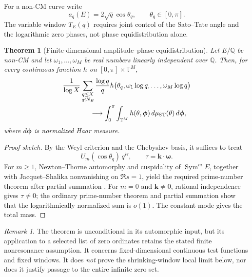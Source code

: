 \documentclass[11pt,reqno]{amsart}
\newtheorem{theorem}{Theorem}
\theoremstyle{remark}
\newtheorem{remark}{Remark}
\newcommand{\Q}{\mathbb{Q}}
\newcommand{\T}{\mathbb{T}}
\newcommand{\ST}{\mathrm{ST}}
\begin{document}
For a non-CM curve write
\begin{equation}
  a_q(E)=2\sqrt q\cos\theta_q,
  \qquad \theta_q\in[0,\pi].
\end{equation}
The variable window $T_E(q)$ requires joint control of the Sato--Tate angle and the logarithmic zero phases, not phase equidistribution alone.

\begin{theorem}[Finite-dimensional amplitude--phase equidistribution]
Let $E/\Q$ be non-CM and let $\omega_1,\ldots,\omega_M$ be real numbers linearly independent over $\Q$.  Then, for every continuous function $h$ on $[0,\pi]\times\T^M$,
\begin{align}
 &\frac{1}{\log X}
 \sum_{\substack{q\le X\\q\nmid N_E}}
 \frac{\log q}{q}
 h\bigl(\theta_q,\omega_1\log q,\ldots,\omega_M\log q\bigr)
 \notag\\
 &\hspace{4em}\longrightarrow
 \int_0^\pi\int_{\T^M}
 h(\theta,\boldsymbol\phi)\,
 d\mu_{\ST}(\theta)\,d\boldsymbol\phi,
 \label{eq:joint-equidistribution}
\end{align}
where $d\boldsymbol\phi$ is normalized Haar measure.
\end{theorem}

\begin{proof}[Proof sketch]
By the Weyl criterion and the Chebyshev basis, it suffices to treat
\begin{equation}
  U_m(\cos\theta_q)\,q^{i\tau},
  \qquad \tau=\boldsymbol k\cdot\boldsymbol\omega.
\end{equation}
For $m\ge1$, Newton--Thorne automorphy and cuspidality of $\operatorname{Sym}^mE$, together with Jacquet--Shalika nonvanishing on $\Re s=1$, yield the required prime-number theorem after partial summation \cite{NewtonThorne2021II,JacquetShalika1976}.  For $m=0$ and $\boldsymbol k\ne0$, rational independence gives $\tau\ne0$; the ordinary prime-number theorem and partial summation show that the logarithmically normalized sum is $o(1)$.  The constant mode gives the total mass.
\end{proof}

\begin{remark}
The theorem is unconditional in its automorphic input, but its application to a selected list of zero ordinates retains the stated finite nonresonance assumption.  It concerns fixed-dimensional continuous test functions and fixed windows.  It does \emph{not} prove the shrinking-window local limit below, nor does it justify passage to the entire infinite zero set.
\end{remark}
\end{document}
